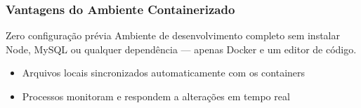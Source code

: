 \begin{frame}
  \frametitle{Vantagens do Ambiente Containerizado}
  \begin{block}{Zero configuração prévia}
    Ambiente de desenvolvimento completo sem instalar Node, MySQL ou qualquer
    dependência — apenas Docker e um editor de código.
  \end{block}

  \vspace{0.5em}
  \begin{itemize}
    \item Arquivos locais sincronizados automaticamente com os containers
    \item Processos monitoram e respondem a alterações em tempo real
  \end{itemize}
\end{frame}